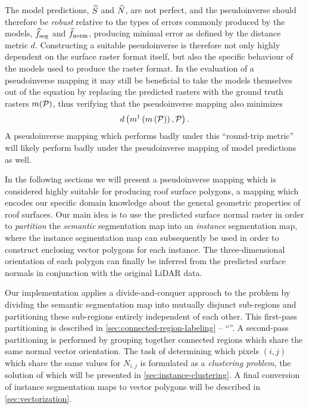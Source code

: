 The model predictions, $\widehat{S}$ and $\widehat{N}$, are not perfect, and the pseudoinverse should therefore be \textit{robust} relative to the types of errors commonly produced by the models, $\widehat{f}_{\mathrm{seg}}$ and $\widehat{f}_{\mathrm{norm}}$, producing minimal error as defined by the distance metric $d$.
Constructing a suitable pseudoinverse is therefore not only highly dependent on the surface raster format itself, but also the specific behaviour of the models used to produce the raster format.
In the evaluation of a pseudoinverse mapping it may still be beneficial to take the models themselves out of the equation by replacing the predicted rasters with the ground truth rasters $m(\mathcal{P})$, thus verifying that the pseudoinverse mapping also minimizes
\begin{equation*}
  d\left(
    m^{\dagger}\left(m\left(\mathcal{P}\right)\right),
    \mathcal{P}
  \right).
\end{equation*}
A pseudoinverse mapping which performs badly under this \enquote{round-trip metric} will likely perform badly under the pseudoinverse mapping of model predictions as well.
\newpage

In the following sections we will present a pseudoinverse mapping which is considered highly suitable for producing roof surface polygons, a mapping which encodes our specific domain knowledge about the general geometric properties of roof surfaces.
Our main idea is to use the predicted surface normal raster in order to \textit{partition} the \textit{semantic} segmentation map into an \textit{instance} segmentation map, where the instance segmentation map can subsequently be used in order to construct enclosing vector polygons for each instance.
The three-dimensional orientation of each polygon can finally be inferred from the predicted surface normals in conjunction with the original LiDAR data.

Our implementation applies a divide-and-conquer approach to the problem by dividing the semantic segmentation map into mutually disjunct sub-regions and partitioning these sub-regions entirely independent of each other.
This first-pass partitioning is described in \cref{sec:connected-region-labeling} -- \enquote{}.
A second-pass partitioning is performed by grouping together connected regions which share the same normal vector orientation.
The task of determining which pixels $(i, j)$ which share the same values for $N_{i, j}$ is formulated as a \textit{clustering problem}, the solution of which will be presented in \cref{sec:instance-clustering}.
A final conversion of instance segmentation maps to vector polygons will be described in \cref{sec:vectorization}.

